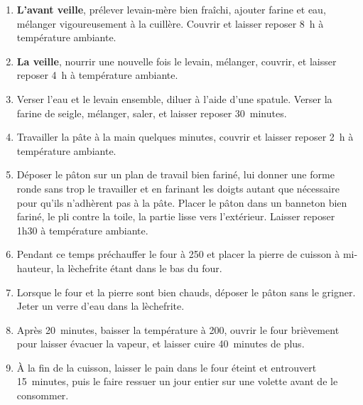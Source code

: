 \begin{recipe}
  \begin{enumerate}

  \item \textbf{L'avant veille}, prélever levain-mère bien fraîchi,
    ajouter farine et eau, mélanger vigoureusement à la cuillère.
    Couvrir et laisser reposer 8~h à température ambiante.
    
  \item \textbf{La veille}, nourrir une nouvelle fois le levain,
    mélanger, couvrir, et laisser reposer 4~h à température ambiante.
    
  \item Verser l'eau et le levain ensemble, diluer à l'aide d'une
    spatule.  Verser la farine de seigle, mélanger, saler, et laisser
    reposer 30~minutes.
    
  \item Travailler la pâte à la main quelques minutes, couvrir et
    laisser reposer 2~h à température ambiante.
    
  \item Déposer le pâton sur un plan de travail bien fariné, lui
    donner une forme ronde sans trop le travailler et en farinant les
    doigts autant que nécessaire pour qu'ils n'adhèrent pas à la
    pâte.  Placer le pâton dans un banneton bien fariné, le pli contre
    la toile, la partie lisse vers l'extérieur.  Laisser reposer 1h30
    à température ambiante.
    
  \item Pendant ce temps préchauffer le four à 250\degreeC{} et placer la
    pierre de cuisson à mi-hauteur, la lèchefrite étant dans le bas du
    four.
    
  \item Lorsque le four et la pierre sont bien chauds, déposer le
    pâton sans le grigner.  Jeter un verre d'eau dans la lèchefrite.
    
  \item Après 20~minutes, baisser la température à 200\degreeC, ouvrir le
    four brièvement pour laisser évacuer la vapeur, et laisser cuire
    40~minutes de plus.
    
  \item À la fin de la cuisson, laisser le pain dans le four éteint et
    entrouvert 15~minutes, puis le faire ressuer un jour entier sur
    une volette avant de le consommer.
    

  \end{enumerate}
\end{recipe}


